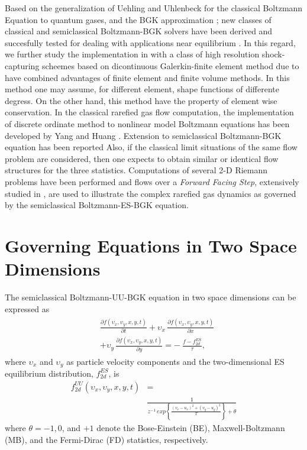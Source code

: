 \documentclass[twoside,twocolumn,prc,floats,amsmath,amssymb]{revtex4} %
\begin{document}
\label{sec:1}   
Based on the generalization of Uehling and Uhlenbeck \cite{Ueh1933} for the classical Boltzmann Equation to quantum gases, and the BGK approximation \cite{BGK1954}; new classes of classical and semiclassical Boltzmann-BGK solvers have been derived and succesfully tested for dealing with applications near equilibrium \cite{Yang2007,Yang2009,Wu2012,Yang2013}. In this regard, we further study the implementation in \cite{Yang2013} with a class of high resolution shock-capturing scheemes based on dicontinuous Galerkin-finite element method due to have combined advantages of finite element and finite volume methods. In this method one may assume, for different element, shape functions of differente degress. On the other hand, this method have the property of element wise conservation. In the classical rarefied gas flow computation, the implementation of discrete ordinate method to nonlinear model Boltzmann equations has been developed by Yang and Huang \cite{Yang1995}.  Extension to semiclassical Boltzmann-BGK equation has been reported \cite{Yang2013} Also, if the classical limit situations of the same flow problem are considered, then one expects to obtain similar or identical flow structures for the three statistics. Computations of several 2-D Riemann problems \cite{Rinne1993, Laxliu1995} have been performed and flows over a \emph{Forward Facing Step}, extensively studied in \cite{Cockburn1998,Woodward1984}, are used to illustrate the complex rarefied gas dynamics as governed by the semiclassical Boltzmann-ES-BGK equation.

\section{Governing Equations in Two Space Dimensions}
\label{sec:3}
The semiclassical Boltzmann-UU-BGK equation in two space dimensions can be expressed as
\begin{align}
\begin{split}
&\frac{\partial f({\upsilon}_x,{\upsilon}_y, x, y, t)}{\partial t} + {\upsilon}_x\,\frac{\partial f({\upsilon}_x,{\upsilon}_y, x, y, t)}{\partial x } \\
&+{\upsilon}_y\,\frac{\partial f({\upsilon}_x,{\upsilon}_y, x, y, t)} {\partial y} =-\ \frac{f-f^{ES}_{2d}}{\tau },
\end{split}
\label{eq:normalized_B_ES_BGK}
\end{align}
where ${\upsilon}_x$ and ${\upsilon}_y$ as particle velocity components and the two-dimensional ES equilibrium distribution, $f^{ES}_{2d}$, is
\begin{equation}
\begin{split}
f^{UU}_{2d}\left({\upsilon}_x,{\upsilon}_y, x, y, t\right) &= \\
&\frac{1}{z^{-1} \, exp\left\{ \frac{(v_{x}-u_{x})^2 + (v_{y}-u_{y})^2}{T}   \right\} + \theta }
\end{split}
\label{eq:normalized_ESBGK_PDF}
\end{equation}
where $\theta = -1, 0$, and $+1$ denote the Bose-Einstein (BE), Maxwell-Boltzmann (MB), and the Fermi-Dirac (FD) statistics, respectively. 
\end{document}
